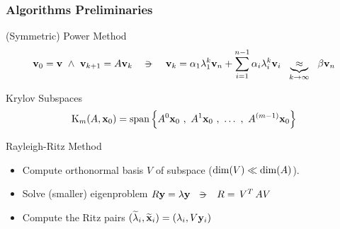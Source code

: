 \begin{frame}
  \frametitle{Algorithms Preliminaries}
  \begin{block}{(Symmetric) Power Method}
    \[
    \joinabove{0}
    \vec{v}_0 = \vec{v} \ds{\land}
    \vec{v}_{k+1} = A\vec{v}_k
    \ds{\ds{\suchthat}}
    \vec{v}_k = \alpha_1 \lambda_1^{k} \vec{v}_n +
    \sum\limits_{\tiny{i=1}}^{n-1} \alpha_i \lambda_i^{k} \vec{v}_i
    \ds{}
    \underbrace{\approx}_{k \to \infty}
    \ds{}    
    \beta \vec{v}_n
    \joinbelow{0}
    \]
  \end{block}
  \begin{block}{Krylov Subspaces}
    \[
    \joinabove{0}
    \Krylov{A}{\vec{x}_0}{m} =
    \func{span}
    \left\{
      A^0\vec{x}_0\ds{,} A^1\vec{x}_0\ds{,} \ldots \ds{,}  A^{(m-1)}\vec{x}_0
      \right\}
    \joinbelow{0}      
    \]
  \end{block}
  \begin{block}{Rayleigh-Ritz Method}
    \begin{itemize}
    \item Compute orthonormal basis $V$ of subspace
      ($\operatorname{dim}(V) \ll \operatorname{dim}(A)$).
    \item Solve (smaller) eigenproblem $R\vec{y} = \lambda\vec{y}
      \ds{\suchthat} R = \trans{V} A V$
    \item Compute the Ritz pairs
      $(\widetilde{\lambda}_i,\widetilde{\mathbf{x}}_i) = (\lambda_i, V\mathbf{y}_i)$
    \end{itemize}
  \end{block}
\end{frame}
